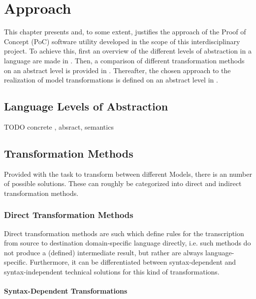 \chapter{Approach}
\label{chap:approach}

This chapter presents and, to some extent, justifies the approach of the Proof of Concept (PoC) software utility developed in the scope of this interdisciplinary project. To achieve this, first an overview of the different levels of abstraction in a language are made in . Then, a comparison of different transformation methods on an abstract level is provided in . Thereafter, the chosen approach to the realization of model transformations is defined on an abstract level in .

\section{Language Levels of Abstraction}
\label{sec:approach:abstraction}

\color{red}TODO concrete , absract, semantics\color{black}

\section{Transformation Methods}
\label{sec:approach:transform}

Provided with the task to transform between different Models, there is an number of possible solutions. These can roughly be categorized into direct and indirect transformation methods.

\subsection{Direct Transformation Methods}

Direct transformation methods are such which define rules for the transcription from source to destination domain-specific language directly, i.e. such methods do not produce a (defined) intermediate result, but rather are always language-specific. Furthermore, it can be differentiated between syntax-dependent and syntax-independent technical solutions for this kind of transformations.

\subsubsection{Syntax-Dependent Transformations}

